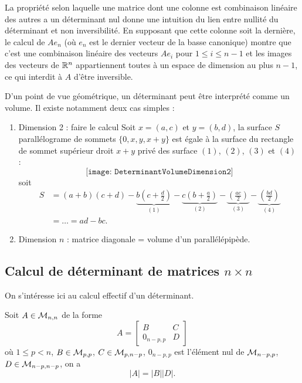 \remark La propriété selon laquelle une matrice dont une colonne est combinaison linéaire des autres a un déterminant nul donne une intuition du lien entre nullité du déterminant et non inversibilité. En supposant que cette colonne soit la dernière, le calcul de $A e_n$ (où $e_n$ est le dernier vecteur de la basse canonique) montre que c'est une combinaison linéaire des vecteurs $A e_i$ pour $1 \leq i \leq n-1$ et les images des vecteurs de $\mathbb{R}^n$ appartiennent toutes à un espace de dimension au plus $n-1$, ce qui interdit à $A$ d'être inversible.

\remark D'un point de vue géométrique, un déterminant peut être interprété comme un volume. Il existe notamment deux cas simples :
\begin{enumerate}
 \item Dimension 2 : faire le calcul
  Soit $x = (a, c)$ et $y = (b, d)$, la surface $S$ parallélograme de sommets $\{0, x, y, x+y\}$ est égale à la surface du rectangle de sommet supérieur droit $x+y$ privé des surface $(1)$, $(2)$, $(3)$ et $(4)$ : 
  $$
  \texttt{[image: DeterminantVolumeDimension2]}
  $$
  soit
  \begin{align*}
    S 
    & = (a+b)(c+d) 
    - \underset{(1)}{\underbrace{b\left(c + \frac{d}2\right)}} 
    - \underset{(2)}{\underbrace{c\left(b + \frac{a}2\right)}} 
    - \underset{(3)}{\underbrace{\left(\frac{ac}2\right)}} 
    - \underset{(4)}{\underbrace{\left(\frac{bd}2\right)}} \\
    & = \dots = ad - bc.
  \end{align*}
 \item Dimension $n$ : matrice diagonale = volume d'un parallélépipède.
\end{enumerate}

\subsection{Calcul de déterminant de matrices $n \times n$} 

On s'intéresse ici au calcul effectif d'un déterminant.

\begin{proposition*}
  Soit $A \in \mathcal{M}_{n,n}$ de la forme
  $$
  A = \left[\begin{array}{cc}
      B & C \\ 0_{n-p, p} & D
    \end{array}\right]
  $$
  où $1 \leq p < n$, $B \in \mathcal{M}_{p, p}$, $C \in \mathcal{M}_{p, n-p}$, $0_{n-p, p}$ est l'élément nul de $\mathcal{M}_{n-p, p}$, $D \in \mathcal{M}_{n-p, n-p}$, on a
  $$
  |A| = |B| |D|.
  $$
\end{proposition*}

